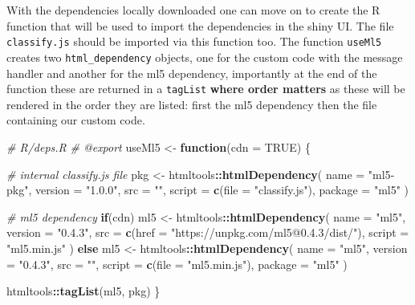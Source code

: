 \documentclass[
  10pt,
]{krantz}
\makeatletter
\newenvironment{Shaded}{\begin{snugshade}}{\end{snugshade}}
\newcommand{\CommentTok}[1]{\textcolor[rgb]{0.37,0.37,0.37}{\textit{#1}}}
\newcommand{\ControlFlowTok}[1]{\textcolor[rgb]{0.27,0.27,0.27}{\textbf{#1}}}
\newcommand{\DataTypeTok}[1]{\textcolor[rgb]{0.27,0.27,0.27}{#1}}
\newcommand{\KeywordTok}[1]{\textcolor[rgb]{0.27,0.27,0.27}{\textbf{#1}}}
\newcommand{\NormalTok}[1]{#1}
\newcommand{\OperatorTok}[1]{\textcolor[rgb]{0.43,0.43,0.43}{\textbf{#1}}}
\newcommand{\OtherTok}[1]{\textcolor[rgb]{0.37,0.37,0.37}{#1}}
\newcommand{\StringTok}[1]{\textcolor[rgb]{0.5,0.5,0.5}{#1}}
\newenvironment{kframe}{%
\medskip{}
\setlength{\fboxsep}{.8em}
 \def\at@end@of@kframe{}%
 \ifinner\ifhmode%
  \def\at@end@of@kframe{\end{minipage}}%
  \begin{minipage}{\columnwidth}%
 \fi\fi%
 \def\FrameCommand##1{\hskip\@totalleftmargin \hskip-\fboxsep
 \colorbox{shadecolor}{##1}\hskip-\fboxsep
     \hskip-\linewidth \hskip-\@totalleftmargin \hskip\columnwidth}%
 \MakeFramed {\advance\hsize-\width
   \@totalleftmargin\z@ \linewidth\hsize
   \@setminipage}}%
 {\par\unskip\endMakeFramed%
 \at@end@of@kframe}
\renewenvironment{Shaded}{\begin{kframe}}{\end{kframe}}
\makeatother
\begin{document}
With the dependencies locally downloaded one can move on to create the R function that will be used to import the dependencies in the shiny UI. The file \texttt{classify.js} should be imported via this function too. The function \texttt{useMl5} creates two \texttt{html\_dependency} objects, one for the custom code with the message handler and another for the ml5 dependency, importantly at the end of the function these are returned in a \texttt{tagList} \textbf{where order matters} as these will be rendered in the order they are listed: first the ml5 dependency then the file containing our custom code.

\begin{Shaded}
\begin{Highlighting}[]
\CommentTok{\# R/deps.R}
\CommentTok{\#\textquotesingle{} @export}
\NormalTok{useMl5 <{-}}\StringTok{ }\ControlFlowTok{function}\NormalTok{(}\DataTypeTok{cdn =} \OtherTok{TRUE}\NormalTok{) \{}

  \CommentTok{\# internal classify.js file}
\NormalTok{  pkg <{-}}\StringTok{ }\NormalTok{htmltools}\OperatorTok{::}\KeywordTok{htmlDependency}\NormalTok{(}
    \DataTypeTok{name =} \StringTok{"ml5{-}pkg"}\NormalTok{,}
    \DataTypeTok{version =} \StringTok{"1.0.0"}\NormalTok{,}
    \DataTypeTok{src =} \StringTok{""}\NormalTok{,}
    \DataTypeTok{script =} \KeywordTok{c}\NormalTok{(}\DataTypeTok{file =} \StringTok{"classify.js"}\NormalTok{),}
    \DataTypeTok{package =} \StringTok{"ml5"}
\NormalTok{  )}

  \CommentTok{\# ml5 dependency}
  \ControlFlowTok{if}\NormalTok{(cdn)}
\NormalTok{    ml5 <{-}}\StringTok{ }\NormalTok{htmltools}\OperatorTok{::}\KeywordTok{htmlDependency}\NormalTok{(}
      \DataTypeTok{name =} \StringTok{"ml5"}\NormalTok{,}
      \DataTypeTok{version =} \StringTok{"0.4.3"}\NormalTok{,}
      \DataTypeTok{src =} \KeywordTok{c}\NormalTok{(}\DataTypeTok{href =} \StringTok{"https://unpkg.com/ml5@0.4.3/dist/"}\NormalTok{),}
      \DataTypeTok{script =} \StringTok{"ml5.min.js"}
\NormalTok{    )}
  \ControlFlowTok{else} 
\NormalTok{    ml5 <{-}}\StringTok{ }\NormalTok{htmltools}\OperatorTok{::}\KeywordTok{htmlDependency}\NormalTok{(}
      \DataTypeTok{name =} \StringTok{"ml5"}\NormalTok{,}
      \DataTypeTok{version =} \StringTok{"0.4.3"}\NormalTok{,}
      \DataTypeTok{src =} \StringTok{""}\NormalTok{,}
      \DataTypeTok{script =} \KeywordTok{c}\NormalTok{(}\DataTypeTok{file =} \StringTok{"ml5.min.js"}\NormalTok{),}
      \DataTypeTok{package =} \StringTok{"ml5"}
\NormalTok{    )}

\NormalTok{  htmltools}\OperatorTok{::}\KeywordTok{tagList}\NormalTok{(ml5, pkg)}
\NormalTok{\}}
\end{Highlighting}
\end{Shaded}
\end{document}
